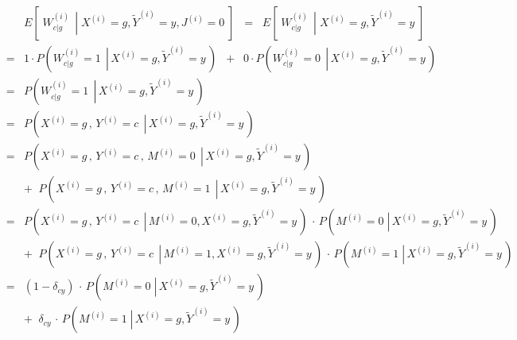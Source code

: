 \begin{eqnarray*}
&&
	E\!\left[\;\left.W^{(i)}_{c \vert g}\,\;\right\vert\;X^{(i)}=g,\widetilde{Y}^{(i)}=y,J^{(i)}=0\;\right]
\;\;=\;\;
	E\!\left[\;\left.W^{(i)}_{c \vert g}\,\;\right\vert\;X^{(i)}=g,\widetilde{Y}^{(i)}=y\;\right]
\\
&=&
	1 \cdot P\!\left(\left.W^{(i)}_{c \vert g} = 1\,\;\right\vert\,X^{(i)}=g,\widetilde{Y}^{(i)}=y\,\right)
	\;\;+\;\;
	0 \cdot P\!\left(\left.W^{(i)}_{c \vert g} = 0\,\;\right\vert\,X^{(i)}=g,\widetilde{Y}^{(i)}=y\,\right)
\\
&=&
	P\!\left(\left.W^{(i)}_{c \vert g} = 1\,\;\right\vert\,X^{(i)}=g,\widetilde{Y}^{(i)}=y\,\right)
\\
&=&
	P\!\left(\left.X^{(i)} = g\,,\,Y^{(i)} = c\,\;\right\vert\,X^{(i)}=g,\widetilde{Y}^{(i)}=y\,\right)
\\
&=&
	P\!\left(\left.X^{(i)} = g\,,\,Y^{(i)} = c\,,\,M^{(i)}=0\,\;\right\vert\,X^{(i)}=g,\widetilde{Y}^{(i)}=y\,\right)
\\
&&
	+ \;\; P\!\left(\left.X^{(i)} = g\,,\,Y^{(i)} = c\,,\,M^{(i)}=1\,\;\right\vert\,X^{(i)}=g,\widetilde{Y}^{(i)}=y\,\right)
\\
&=&
	P\!\left(\left.X^{(i)} = g\,,\,Y^{(i)} = c\,\;\right\vert\,M^{(i)}=0,X^{(i)}=g,\widetilde{Y}^{(i)}=y\,\right)
	\,\cdot\,
	P\!\left(\left.M^{(i)}=0\;\right\vert\,X^{(i)}=g,\widetilde{Y}^{(i)}=y\,\right)
\\
&&
	+ \;\;
	P\!\left(\left.X^{(i)} = g\,,\,Y^{(i)} = c\,\;\right\vert\,M^{(i)}=1,X^{(i)}=g,\widetilde{Y}^{(i)}=y\,\right)
	\,\cdot\,
	P\!\left(\left.M^{(i)}=1\;\right\vert\,X^{(i)}=g,\widetilde{Y}^{(i)}=y\,\right)
\\
&=&
	\left(1 - \delta_{cy}\right)
	\,\cdot\,
	P\!\left(\left.M^{(i)}=0\;\right\vert\,X^{(i)}=g,\widetilde{Y}^{(i)}=y\,\right)
\\
&&
	+ \;\;
	\delta_{cy}
	\,\cdot\,
	P\!\left(\left.M^{(i)}=1\;\right\vert\,X^{(i)}=g,\widetilde{Y}^{(i)}=y\,\right)
\end{eqnarray*}



\renewcommand{\theenumi}{\roman{enumi}}
\renewcommand{\labelenumi}{\textnormal{(\theenumi)}$\;\;$}

